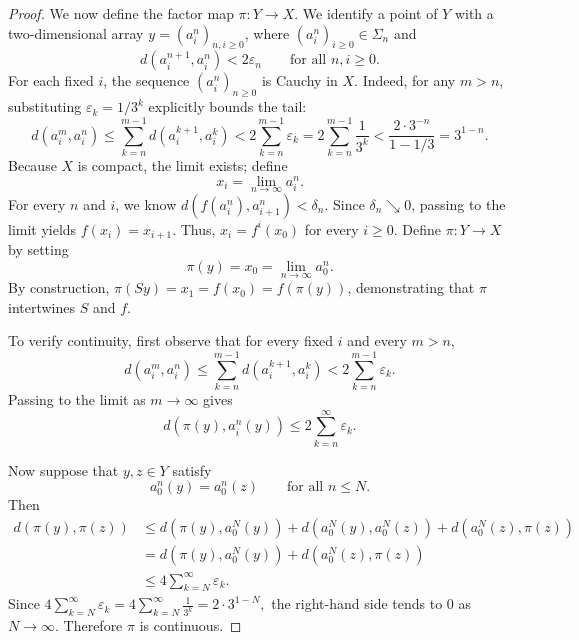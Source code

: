 \documentclass[10pt,a4paper]{amsart}
\numberwithin{equation}{section}
\begin{document}
\begin{proof}
We now define the factor map $\pi: Y \to X$. We identify a point of $Y$ with a two-dimensional array $y = (a_i^n)_{n,i\geq 0}$, where $(a_i^n)_{i\geq 0} \in \Sigma_n$ and
\[
        d(a_i^{n+1}, a_i^n) < 2\varepsilon_n
        \qquad\text{for all } n, i \geq 0.
\]
For each fixed $i$, the sequence $(a_i^n)_{n\geq 0}$ is Cauchy in $X$. Indeed, for any $m > n$, substituting $\varepsilon_k = 1/3^k$ explicitly bounds the tail:
\[
        d(a_i^m, a_i^n)
        \leq
        \sum_{k=n}^{m-1} d(a_i^{k+1}, a_i^k)
        <
        2\sum_{k=n}^{m-1} \varepsilon_k
        =
        2\sum_{k=n}^{m-1} \frac{1}{3^k}
        <
        \frac{2 \cdot 3^{-n}}{1 - 1/3}
        =
        3^{1-n}.
\]
Because $X$ is compact, the limit exists; define
\[
        x_i = \lim_{n\to\infty} a_i^n.
\]
For every $n$ and $i$, we know $d(f(a_i^n), a_{i+1}^n) < \delta_n$. Since $\delta_n \searrow 0$, passing to the limit yields $f(x_i) = x_{i+1}$. Thus, $x_i = f^i(x_0)$ for every $i \geq 0$. Define $\pi: Y \to X$ by setting
\[
        \pi(y) = x_0 = \lim_{n\to\infty} a_0^n.
\]
By construction, $\pi(Sy) = x_1 = f(x_0) = f(\pi(y))$, demonstrating that $\pi$ intertwines $S$ and $f$.

To verify continuity, first observe that for every fixed $i$ and every $m>n$,
\[
d(a_i^m,a_i^n)
\le
\sum_{k=n}^{m-1} d(a_i^{k+1},a_i^k)
<
2\sum_{k=n}^{m-1}\varepsilon_k .
\]
Passing to the limit as $m\to\infty$ gives
\[
d(\pi(y),a_i^n(y))
\le
2\sum_{k=n}^{\infty}\varepsilon_k .
\]

Now suppose that $y,z\in Y$ satisfy
\[
a_0^n(y)=a_0^n(z)
\qquad
\text{for all } n\le N .
\]
Then
\[
\begin{aligned}
d(\pi(y),\pi(z))
&\le
d(\pi(y),a_0^N(y))
+d(a_0^N(y),a_0^N(z))
+d(a_0^N(z),\pi(z))\\
&=
d(\pi(y),a_0^N(y))
+d(a_0^N(z),\pi(z))\\
&\le
4\sum_{k=N}^{\infty}\varepsilon_k.
\end{aligned}
\]
Since
$
4\sum_{k=N}^{\infty}\varepsilon_k
=
4\sum_{k=N}^{\infty}\frac1{3^k}
=
2\cdot3^{1-N},
$
the right-hand side tends to $0$ as $N\to\infty$. Therefore $\pi$ is continuous.


\end{proof}
\end{document}
